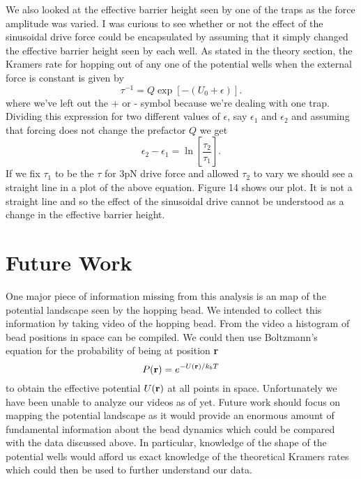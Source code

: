 \documentclass{report}
\begin{document}
We also looked at the effective barrier height seen by one of the traps as the force amplitude was varied. I was curious to see whether or not the effect of the sinusoidal drive force could be encapsulated by assuming that it simply changed the effective barrier height seen by each well. As stated in the theory section, the Kramers rate for hopping out of any one of the potential wells when the external force is constant is given by
\begin{displaymath}
\tau^{-1} = Q \exp\left[-(U_0 + \epsilon )\right].
\end{displaymath}
where we've left out the + or - symbol because we're dealing with one trap. Dividing this expression for two different values of $\epsilon$, say $\epsilon_1$ and $\epsilon_2$ and assuming that forcing does not change the prefactor $Q$ we get
\begin{displaymath}
\epsilon_2-\epsilon_1 = \ln \left[ \frac{\tau_2}{\tau_1} \right] .
\end{displaymath}
If we fix $\tau_1$ to be the $\tau$ for 3pN drive force and allowed $\tau_2$ to vary we should see a straight line in a plot of the above equation. Figure 14 shows our plot. It is not a straight line and so the effect of the sinusoidal drive cannot be understood as a change in the effective barrier height.

\section{Future Work}

One major piece of information missing from this analysis is an map of the potential landscape seen by the hopping bead. We intended to collect this information by taking video of the hopping bead. From the video a histogram of bead positions in space can be compiled. We could then use Boltzmann's equation for the probability of being at position \textbf{r}
\begin{displaymath}
P(\textrm{\textbf{r}}) = e^{-U(\textrm{\textbf{r}})/k_bT}
\end{displaymath}
to obtain the effective potential $U(\textrm{\textbf{r}})$ at all points in space. Unfortunately we have been unable to analyze our videos as of yet. Future work should focus on mapping the potential landscape as it would provide an enormous amount of fundamental information about the bead dynamics which could be compared with the data discussed above. In particular, knowledge of the shape of the potential wells would afford us exact knowledge of the theoretical Kramers rates which could then be used to further understand our data.
\end{document}
